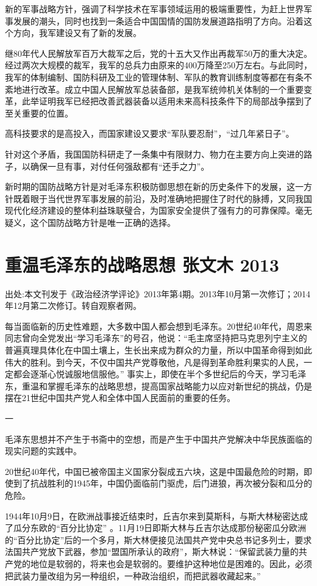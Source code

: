 \documentclass[UTF8, 12pt, a4paper]{ctexrep}
\begin{document}
新的军事战略方针，强调了科学技术在军事领域运用的极端重要性，为赶上世界军事发展的潮头，同时也找到一条适合中国国情的国防发展道路指明了方向。沿着这个方向，我军建设又有了新的发展。

继80年代人民解放军百万大裁军之后，党的十五大又作出再裁军50万的重大决定。经过两次大规模的裁军，我军的总兵力由原来的400万降至250万左右。与此同时，我军的体制编制、国防科研及工业的管理体制、军队的教育训练制度等都在有条不紊地进行改革。成立中国人民解放军总装备部，是我军统帅机关体制的一个重要变革，此举证明我军已经把改善武器装备以适用未来高科技条件下的局部战争摆到了至关重要的位置。

高科技要求的是高投入，而国家建设又要求“军队要忍耐”，“过几年紧日子”。

针对这个矛盾，我国国防科研走了一条集中有限财力、物力在主要方向上突进的路子，以确保一旦有事，对付任何强敌都有“还手之力”。

新时期的国防战略方针是对毛泽东积极防御思想在新的历史条件下的发展，这一方针既着眼于当代世界军事发展的前沿，及时准确地把握住了时代的脉搏，又同我国现代化经济建设的整体利益珠联璧合，为国家安全提供了强有力的可靠保障。毫无疑义，这个国防战略方针是唯一正确的选择。

\newpage

\chapter{重温毛泽东的战略思想 张文木 2013}

出处:本文刊发于《政治经济学评论》2013年第4期。2013年10月第一次修订；2014年12月第二次修订。转自观察者网。

\newpage

每当面临新的历史性难题，大多数中国人都会想到毛泽东。20世纪40年代，周恩来同志曾向全党发出“学习毛泽东”的号召，他说：“毛主席坚持把马克思列宁主义的普遍真理具体化在中国土壤上，生长出来成为群众的力量，所以中国革命得到如此伟大的胜利。到今天，不仅中国共产党尊敬他，凡是得到革命胜利果实的人民，一定都会逐渐心悦诚服地信服他。” 事实上，即使在半个多世纪后的今天，学习毛泽东，重温和掌握毛泽东的战略思想，提高国家战略能力以应对新世纪的挑战，仍是摆在21世纪中国共产党人和全体中国人民面前的重要的任务。

一

毛泽东思想并不产生于书斋中的空想，而是产生于中国共产党解决中华民族面临的现实问题的实践中。

20世纪40年代，中国已被帝国主义国家分裂成五六块，这是中国最危险的时期，即使到了抗战胜利的1945年，中国仍面临前门驱虎，后门进狼，再次被分裂和瓜分的危险。

1944年10月9日，在欧洲战事接近结束时，丘吉尔来到莫斯科，与斯大林秘密达成了瓜分东欧的“百分比协定” 。11月19日即斯大林与丘吉尔达成那份秘密瓜分欧洲的“百分比协定”后的一个多月，斯大林便接见法国共产党中央总书记多列士，要求法国共产党放下武器，参加“盟国所承认的政府”，斯大林说：“保留武装力量的共产党的地位是软弱的，将来也会是软弱的。要维护这种地位是困难的。因此，必须把武装力量改组为另一种组织，一种政治组织，而把武器收藏起来。”
\end{document}
